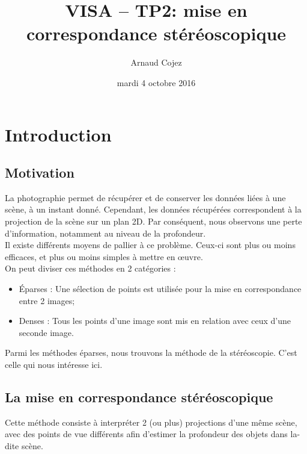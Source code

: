 \documentclass[a4paper]{article}
\begin{document}
\title{VISA -- TP2: mise en correspondance stéréoscopique}
\author{Arnaud Cojez}
\date{mardi 4 octobre 2016}

\maketitle

\newpage
\tableofcontents
\newpage

\section{Introduction}

\subsection{Motivation}
La photographie permet de récupérer et de conserver les données liées à une scène, à un instant donné. Cependant, les données récupérées correspondent à la projection de la scène sur un plan 2D. Par conséquent, nous observons une perte d'information, notamment au niveau de la profondeur.\\

Il existe différents moyens de pallier à ce problème. Ceux-ci sont plus ou moins efficaces, et plus ou moins simples à mettre en œuvre.\\
On peut diviser ces méthodes en 2 catégories :
\begin{itemize}
    \item Éparses : Une sélection de points est utilisée pour la mise en correspondance entre 2 images;
    \item Denses : Tous les points d'une image sont mis en relation avec ceux d'une seconde image.
\end{itemize}

Parmi les méthodes éparses, nous trouvons la méthode de la stéréoscopie. C'est celle qui nous intéresse ici.

\subsection{La mise en correspondance stéréoscopique}

Cette méthode consiste à interpréter 2 (ou plus) projections d'une même scène, avec des points de vue différents afin d'estimer la profondeur des objets dans la-dite scène.\\
\end{document}
